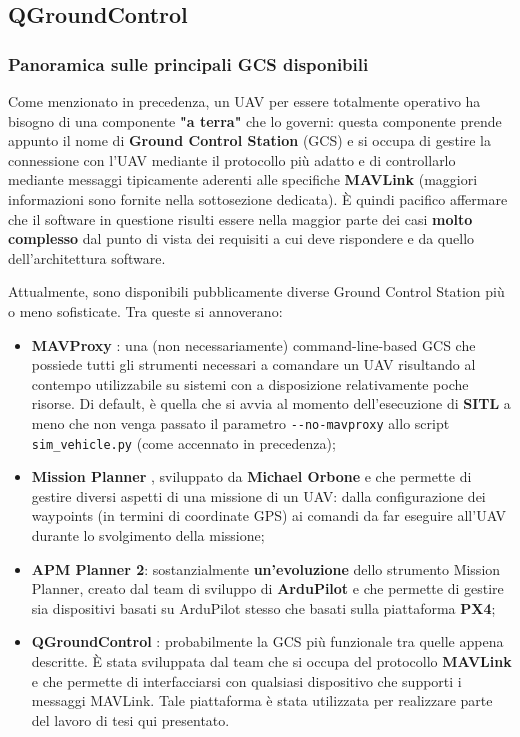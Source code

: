 \documentclass[a4paper, 12pt, oneside]{article}
\begin{document}
\newpage

\subsection{QGroundControl}

\subsubsection{Panoramica sulle principali GCS disponibili}

Come menzionato in precedenza, un UAV per essere totalmente operativo ha bisogno di una componente \textbf{"a terra"} che lo governi: questa componente prende appunto il nome di \textbf{Ground Control Station} (GCS) e si occupa di gestire la connessione con l'UAV mediante il protocollo più adatto e di controllarlo mediante messaggi tipicamente aderenti alle specifiche \textbf{MAVLink} (maggiori informazioni sono fornite nella sottosezione dedicata). È quindi pacifico affermare che il software in questione risulti essere nella maggior parte dei casi \textbf{molto complesso} dal punto di vista dei requisiti a cui deve rispondere e da quello dell'architettura software.

Attualmente, sono disponibili pubblicamente diverse Ground Control Station più o meno sofisticate. Tra queste si annoverano:

\begin{itemize}
    \item \textbf{MAVProxy} \cite{mavproxy}: una (non necessariamente) command-line-based GCS che possiede tutti gli strumenti necessari a comandare un UAV risultando al contempo utilizzabile su sistemi con a disposizione relativamente poche risorse. Di default, è quella che si avvia al momento dell'esecuzione di \textbf{SITL} a meno che non venga passato il parametro \texttt{-{}-no-mavproxy} allo script \texttt{sim\_vehicle.py} (come accennato in precedenza);
    \item \textbf{Mission Planner} \cite{mission-planner}, sviluppato da \textbf{Michael Orbone} e che permette di gestire diversi aspetti di una missione di un UAV: dalla configurazione dei waypoints (in termini di coordinate GPS) ai comandi da far eseguire all'UAV durante lo svolgimento della missione;
    \item \textbf{APM Planner 2}: sostanzialmente \textbf{un'evoluzione} dello strumento Mission Planner, creato dal team di sviluppo di \textbf{ArduPilot} e che permette di gestire sia dispositivi basati su ArduPilot stesso che basati sulla piattaforma \textbf{PX4};
    \item \textbf{QGroundControl} \cite{qgroundcontrol}: probabilmente la GCS più funzionale tra quelle appena descritte. È stata sviluppata dal team che si occupa del protocollo \textbf{MAVLink} e che permette di interfacciarsi con qualsiasi dispositivo che supporti i messaggi MAVLink. Tale piattaforma è stata utilizzata per realizzare parte del lavoro di tesi qui presentato. 
\end{itemize}
\end{document}
